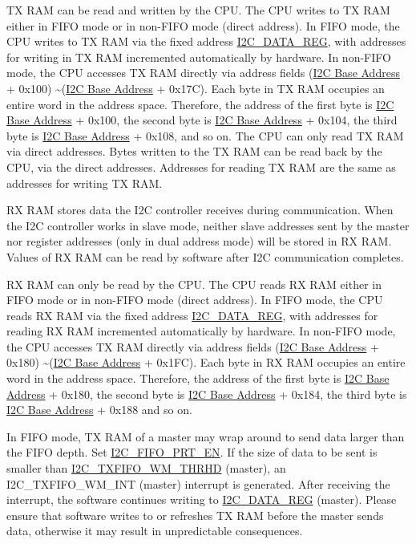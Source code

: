\documentclass[main\_\_EN.tex]{subfiles}
\begin{document}
TX RAM can be read and written by the CPU. The CPU writes to TX RAM either in FIFO mode or in non-FIFO mode (direct address). In FIFO mode, the CPU writes to TX RAM via the fixed address \hyperref[regdesc:I2CDATAREG]{I2C\_DATA\_REG}, with addresses for writing in TX RAM incremented automatically by hardware. In non-FIFO mode, the CPU accesses TX RAM directly via address fields (\hyperref[tab:sysmem-base-address]{I2C Base Address} + 0x100) \textasciitilde (\hyperref[tab:sysmem-base-address]{I2C Base Address} + 0x17C). Each byte in TX RAM occupies an entire word in the address space. Therefore, the address of the first byte is \hyperref[tab:sysmem-base-address]{I2C Base Address} + 0x100, the second byte is \hyperref[tab:sysmem-base-address]{I2C Base Address} + 0x104, the third byte is \hyperref[tab:sysmem-base-address]{I2C Base Address} + 0x108, and so on. The CPU can only read TX RAM via direct addresses. Bytes written to the TX RAM can be read back by the CPU, via the direct addresses. Addresses for reading TX RAM are the same as addresses for writing TX RAM.

RX RAM stores data the I2C controller receives during communication. When the I2C controller works in slave mode, neither slave addresses sent by the master nor register addresses (only in dual address mode) will be stored in RX RAM. Values of RX RAM can be read by software after I2C communication completes.

RX RAM can only be read by the CPU. The CPU reads RX RAM either in FIFO mode or in non-FIFO mode (direct address). In FIFO mode, the CPU reads RX RAM via the fixed address \hyperref[regdesc:I2CDATAREG]{I2C\_DATA\_REG}, with addresses for reading RX RAM incremented automatically by hardware. In non-FIFO mode, the CPU accesses TX RAM directly via address fields (\hyperref[tab:sysmem-base-address]{I2C Base Address} + 0x180) \textasciitilde (\hyperref[tab:sysmem-base-address]{I2C Base Address} + 0x1FC). Each byte in RX RAM occupies an entire word in the address space. Therefore, the address of the first byte is \hyperref[tab:sysmem-base-address]{I2C Base Address} + 0x180, the second byte is \hyperref[tab:sysmem-base-address]{I2C Base Address} + 0x184, the third byte is \hyperref[tab:sysmem-base-address]{I2C Base Address} + 0x188 and so on.

In FIFO mode, TX RAM of a master may wrap around to send data larger than the FIFO depth. Set \hyperref[fielddesc:I2CFIFOPRTEN]{I2C\_FIFO\_PRT\_EN}. If the size of data to be sent is smaller than \hyperref[fielddesc:I2CTXFIFOWMTHRHD]{I2C\_TXFIFO\_WM\_THRHD} (master), an I2C\_TXFIFO\_WM\_INT (master) interrupt is generated. After receiving the interrupt, the software continues writing to \hyperref[regdesc:I2CDATAREG]{I2C\_DATA\_REG} (master). Please ensure that software writes to or refreshes TX RAM before the master sends data, otherwise it may result in unpredictable consequences.
\end{document}
